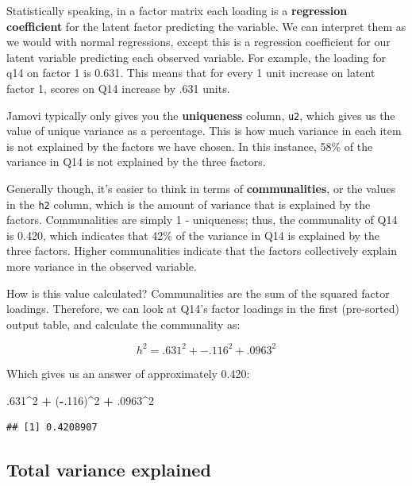 \documentclass[
]{book}
\newenvironment{Shaded}{\begin{snugshade}}{\end{snugshade}}
\newcommand{\DecValTok}[1]{\textcolor[rgb]{0.00,0.00,0.81}{#1}}
\newcommand{\NormalTok}[1]{#1}
\newcommand{\SpecialCharTok}[1]{\textcolor[rgb]{0.81,0.36,0.00}{\textbf{#1}}}
\begin{document}
Statistically speaking, in a factor matrix each loading is a \textbf{regression coefficient} for the latent factor predicting the variable. We can interpret them as we would with normal regressions, except this is a regression coefficient for our latent variable predicting each observed variable. For example, the loading for q14 on factor 1 is 0.631. This means that for every 1 unit increase on latent factor 1, scores on Q14 increase by .631 units.

Jamovi typically only gives you the \textbf{uniqueness} column, \texttt{u2}, which gives us the value of unique variance as a percentage. This is how much variance in each item is not explained by the factors we have chosen. In this instance, 58\% of the variance in Q14 is not explained by the three factors.

Generally though, it's easier to think in terms of \textbf{communalities}, or the values in the \texttt{h2} column, which is the amount of variance that is explained by the factors. Communalities are simply 1 - uniqueness; thus, the communality of Q14 is 0.420, which indicates that 42\% of the variance in Q14 is explained by the three factors. Higher communalities indicate that the factors collectively explain more variance in the observed variable.

How is this value calculated? Communalities are the sum of the squared factor loadings. Therefore, we can look at Q14's factor loadings in the first (pre-sorted) output table, and calculate the communality as:

\[
h^2 = .631^2 + -.116^2 + .0963^2
\]

Which gives us an answer of approximately 0.420:

\begin{Shaded}
\begin{Highlighting}[]
\NormalTok{.}\DecValTok{631}\SpecialCharTok{\^{}}\DecValTok{2} \SpecialCharTok{+}\NormalTok{ (}\SpecialCharTok{{-}}\NormalTok{.}\DecValTok{116}\NormalTok{)}\SpecialCharTok{\^{}}\DecValTok{2} \SpecialCharTok{+}\NormalTok{ .}\DecValTok{0963}\SpecialCharTok{\^{}}\DecValTok{2}
\end{Highlighting}
\end{Shaded}

\begin{verbatim}
## [1] 0.4208907
\end{verbatim}

\hypertarget{total-variance-explained}{%
\subsection{Total variance explained}\label{total-variance-explained}}
\end{document}
